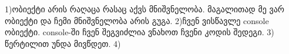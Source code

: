 1)ობიექტი არის რაღაცა რასაც აქვს მნიშვნელობა. მაგალითად მე ვარ ობიექტი და ჩემი მნიშვნელობა არის გუგა.
2)ჩვენ ვისწავლე console ობიექტი. console-ში ჩვენ შეგვიძლია ვნახოთ ჩვენი კოდის შედეგი.
3) წერტილით უნდა მივწდეთ.
4)